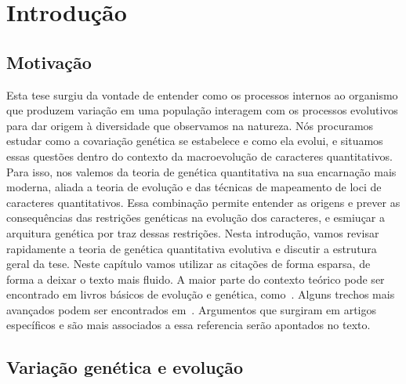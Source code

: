 \cleardoublepage

\pagestyle{fancy}


\chapter{Introdução}\label{intro}


\section{Motivação}\label{intro:historico}

\begin{refsection}

Esta tese surgiu da vontade de entender como os processos internos ao
organismo que produzem variação em uma população interagem com os processos
evolutivos para dar origem à diversidade que observamos na natureza.
Nós procuramos estudar como a covariação genética se estabelece
e como ela evolui, e situamos essas questões dentro do contexto da
macroevolução de caracteres quantitativos. Para isso, nos valemos da teoria de
genética quantitativa na sua encarnação mais moderna, aliada a teoria de
evolução e das técnicas de mapeamento de loci de caracteres quantitativos.
Essa combinação permite entender as origens e prever as consequências das restrições
genéticas na evolução dos caracteres, e esmiuçar a arquitura genética por traz
dessas restrições. Nesta introdução, vamos revisar rapidamente a teoria de
genética quantitativa evolutiva e discutir a estrutura geral da tese. Neste
capítulo vamos utilizar as citações de forma esparsa, de forma a deixar o texto mais
fluido. A maior parte do contexto teórico pode ser encontrado em livros
básicos de evolução e genética, como~\textcite{Falconer1996-ot,
Lynch1998-ql, Barton2007-hq}. Alguns trechos mais avançados podem ser
encontrados em~\textcite{Rice2004-jf, Buerger2000-ez}. Argumentos que surgiram
em artigos específicos e são mais associados a essa referencia serão
apontados no texto.

\section{Variação genética e evolução} 


\end{refsection}
